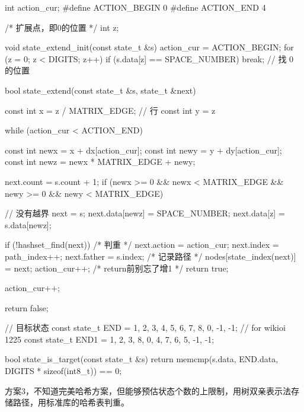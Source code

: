 \begin{Codex}[label=eight_digits_bfs2.c]
int action_cur;
#define ACTION_BEGIN 0
#define ACTION_END 4

/* 扩展点，即0的位置 */
int z;

void state_extend_init(const state_t &s) {
    action_cur = ACTION_BEGIN;
    for (z = 0; z < DIGITS; z++) {
        if (s.data[z] == SPACE_NUMBER) {
            break;  // 找 0 的位置
        }
    }
}

bool state_extend(const state_t &s, state_t &next) {
    const int x = z / MATRIX_EDGE; // 行
    const int y = z %

    while (action_cur < ACTION_END) {
        const int newx = x + dx[action_cur];
        const int newy = y + dy[action_cur];
        const int newz = newx * MATRIX_EDGE + newy;

        next.count = s.count + 1;
        if (newx >= 0 && newx < MATRIX_EDGE && newy >= 0 &&
                newy < MATRIX_EDGE) { // 没有越界
            next = s;
            next.data[newz] = SPACE_NUMBER;
            next.data[z] = s.data[newz];

            if (!hashset_find(next)) { /* 判重 */
                next.action = action_cur;
                next.index = path_index++;
                next.father = s.index;
                /* 记录路径 */
                nodes[state_index(next)] = next;
                action_cur++; /* return前别忘了增1 */
                return true;
            }
        }
        action_cur++;
    }
    return false;
}

// 目标状态
const state_t END = {{1, 2, 3, 4, 5, 6, 7, 8, 0}, -1, -1};
// for wikioi 1225
const state_t END1 = {{1, 2, 3, 8, 0, 4, 7, 6, 5}, -1, -1};

bool state_is_target(const state_t &s) {
    return memcmp(s.data, END.data, DIGITS * sizeof(int8_t)) == 0;
}
\end{Codex}

方案3，不知道完美哈希方案，但能够预估状态个数的上限制，用树双亲表示法存储路径，用标准库的哈希表判重。

